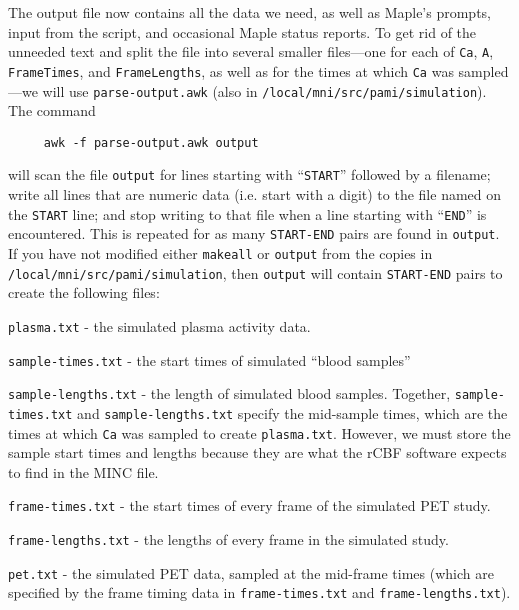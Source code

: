 The output file now contains all the data we need, as well as Maple's
prompts, input from the script, and occasional Maple status reports.
To get rid of the unneeded text and split the file into several
smaller files---one for each of \verb|Ca|, \verb|A|, \verb|FrameTimes|,
and \verb|FrameLengths|, as well as for the times at which \verb|Ca|
was sampled---we will use \verb|parse-output.awk| (also in
\verb|/local/mni/src/pami/simulation|).  The command
\begin{verbatim}
     awk -f parse-output.awk output
\end{verbatim}
will scan the file \verb|output| for lines starting with
``\verb|START|'' followed by a filename; write all lines that are
numeric data (i.e. start with a digit) to the file named on the
\verb|START| line; and stop writing to that file when a line starting
with ``\verb|END|'' is encountered.  This is repeated for as many
\verb|START-END| pairs are found in \verb|output|.  If you have not
modified either \verb|makeall| or \verb|output| from the copies in
\verb|/local/mni/src/pami/simulation|, then \verb|output| will contain
\verb|START-END| pairs to create the following files:
\begin{description}
\item \verb|plasma.txt| - the simulated plasma activity data.
\item \verb|sample-times.txt| - the start times of simulated ``blood samples''
\item \verb|sample-lengths.txt| - the length of simulated blood samples.  
Together, \verb|sample-times.txt| and \verb|sample-lengths.txt|
specify the mid-sample times, which are the times at which \verb|Ca|
was sampled to create \verb|plasma.txt|.  However, we must store the
sample start times and lengths because they are what the rCBF software
expects to find in the MINC file.
\item \verb|frame-times.txt| - the start times of every frame of the
simulated PET study.
\item \verb|frame-lengths.txt| - the lengths of every frame in the
simulated study.
\item \verb|pet.txt| - the simulated PET data, sampled at the
mid-frame times (which are specified by the frame timing data in
\verb|frame-times.txt| and \verb|frame-lengths.txt|).
\end{description}

